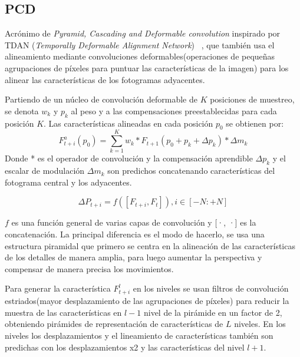     \subsection {PCD}
        Acrónimo de \emph{Pyramid, Cascading and Deformable convolution} inspirado por TDAN (\emph {Temporally Deformable Alignment Network}) ~\cite{tian2018tdan}, que también usa el alineamiento mediante convoluciones deformables(operaciones de pequeñas agrupaciones de píxeles para puntuar las características de la imagen) para los alinear las características de los fotogramas adyacentes. 

    
        Partiendo de un núcleo de convolución deformable de $K$ posiciones de muestreo, se denota $w_k$  y  $p_k$ al peso y a las compensaciones preestablecidas para cada posición $K$. Las características alineadas  en cada posición  $p_0$ se obtienen por:
        \begin{equation}\label{12}
            F^a_{t+i} (p_0) = \sum^K_{k=1} w_k * F_{t+1}(p_0 + p_k +\Delta p_k) * \Delta m_k
        \end{equation}
      Donde * es el operador de convolución y la compensación aprendible $\Delta p_k $ y el escalar de modulación $\Delta m_k $ son predichos concatenando características del fotograma central y los adyacentes.
        
         \begin{equation}\label{27}
          \Delta P_{t+i} = f([F_{t+i}, F_t]), i \in [-N:+N]
        \end{equation}
        
        \noindent $f$ es una función general de varias capas de convolución y  [·, ·] es la concatenación.
        La principal diferencia es el modo de hacerlo, se usa una estructura piramidal que primero se centra en la alineación de las características de los detalles de manera amplia, para luego aumentar la perspectiva y compensar de manera precisa los movimientos.
        
        Para generar la característica $F^l_{t+i}$ en los niveles se usan filtros de convolución estriados(mayor desplazamiento de las agrupaciones de píxeles) para reducir la muestra de las características en $l-1$ nivel de la pirámide en un factor de 2, obteniendo pirámides de representación de características de $L$ niveles. En los niveles los desplazamientos y el lineamiento de características también son predichas con los desplazamientos x2 y las características del nivel $l+1$.

